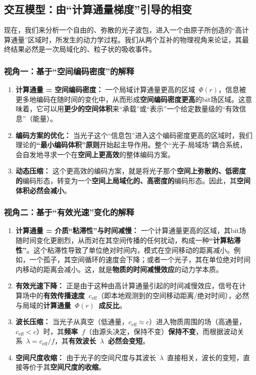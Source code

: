 \documentclass[12pt]{article}
\begin{document}
\subsection{交互模型：由``计算通量梯度''引导的相变}

现在，我们来分析一个自由的、弥散的光子波包，进入一个由原子所创造的``高计算通量''区域时，所发生的动力学过程。我们从两个互补的物理视角来论证，其最终结果必然是一次局域化的、粒子状的吸收事件。

\subsubsection{视角一：基于``空间编码密度''的解释}
\begin{enumerate}
    \item \textbf{计算通量 = 空间编码密度：} 一个局域计算通量更高的区域~$\Phi(r)$，信息被更多地编码在随时间的变化中，从而形成\textbf{空间编码密度更高}的bit场区域。这意味着，它可以用\textbf{更少的空间体积}来``承载''或``表示''一个给定数量级的``有效信息''（能量）。
    \item \textbf{编码方案的优化：} 当光子这个``信息包''进入这个编码密度更高的区域时，我们理论的\textbf{``最小编码体积''原则}开始起主导作用。整个``光子-局域场''耦合系统，会自发地寻求一个在\textbf{空间上更高效}的整体编码方案。
    \item \textbf{动态压缩：} 这个更高效的编码方案，就是将光子那个\textbf{空间上弥散的、低密度的}编码形态，转变为一个\textbf{空间上局域化的、高密度的}编码形态。因此，其\textbf{空间体积必然会减小}。
\end{enumerate}

\subsubsection{视角二：基于``有效光速''变化的解释}
\begin{enumerate}
    \item \textbf{计算通量 = 介质``粘滞性''与时间减慢：} 一个计算通量更高的区域，其bit场随时间变化更剧烈，从而对在其空间传播的任何扰动，构成一种\textbf{``计算粘滞性''}。这个粘滞性导致了单位绝对时间内，模式在空间移动的距离减小。例如，一个孤子，其空间循环的速度会下降；或者一个光子，其在单位绝对时间内移动的距离会减小。这，就是\textbf{物质的时间减慢效应}的动力学本质。
    \item \textbf{有效光速下降：} 正是由于这种由高计算通量引起的时间减慢效应，信号在计算场中的\textbf{有效传播速度~$c_{\text{eff}}$}（即本地观测到的空间移动距离/绝对时间），必然与局域的\textbf{计算通量~$\Phi(r)$~成反比}。
    \item \textbf{波长压缩：} 当光子从真空（低通量，$c_{\text{eff}} \approx c$）进入物质周围的场（高通量，$c_{\text{eff}} < c$）时，其\textbf{频率~$f$}（由源头决定，保持不变）\textbf{保持不变}，而根据波动关系~$\lambda = c_{\text{eff}} / f$，其\textbf{有效波长~$\lambda$~必然会变短}。
    \item \textbf{空间尺度收缩：} 由于光子的空间尺度与其波长~$\lambda$~直接相关，波长的变短，直接等价于其\textbf{空间尺度的收缩}。
\end{enumerate}
\end{document}
